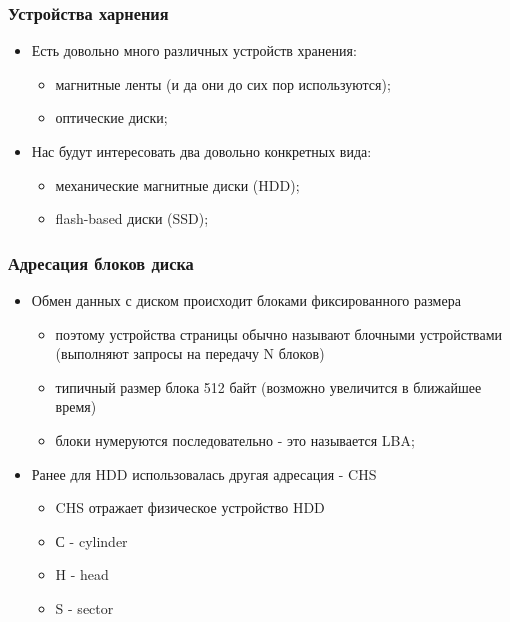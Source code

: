 \begin{frame}
\frametitle{Устройства харнения}
\begin{itemize}
  \item<1-> Есть довольно много различных устройств хранения:
    \begin{itemize}
      \item магнитные ленты (и да они до сих пор используются);
      \item оптические диски;
    \end{itemize}
  \item<2-> Нас будут интересовать два довольно конкретных вида:
    \begin{itemize}
      \item механические магнитные диски (HDD);
      \item flash-based диски (SSD);
    \end{itemize}
\end{itemize}
\end{frame}

\begin{frame}
\frametitle{Адресация блоков диска}
\begin{itemize}
  \item<1-> Обмен данных с диском происходит блоками фиксированного размера
    \begin{itemize}
      \item поэтому устройства страницы обычно называют блочными устройствами (выполняют запросы на передачу N блоков)
      \item типичный размер блока 512 байт (возможно увеличится в ближайшее время)
      \item блоки нумеруются последовательно - это называется LBA;
    \end{itemize}
  \item<2-> Ранее для HDD использовалась другая адресация - CHS
    \begin{itemize}
      \item CHS отражает физическое устройство HDD
      \item С - cylinder
      \item H - head
      \item S - sector
    \end{itemize}
\end{itemize}
\end{frame}

